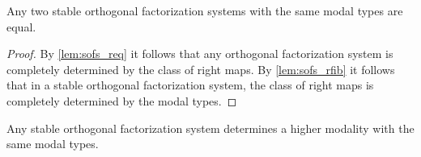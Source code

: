 \begin{thm}\label{thm:subuniv-sofs}
Any two stable orthogonal factorization systems with the same modal types are
equal.
\end{thm}

\begin{proof}
By \autoref{lem:sofs_req} it follows that any orthogonal factorization system
is completely determined by the class of right maps.
By \autoref{lem:sofs_rfib} it follows that in a stable orthogonal factorization
system, the class of right maps is completely determined by the modal types.
\end{proof}

\begin{thm}\label{thm:highermod_from_sofs}
Any stable orthogonal factorization system determines a higher modality with
the same modal types.
\end{thm}

